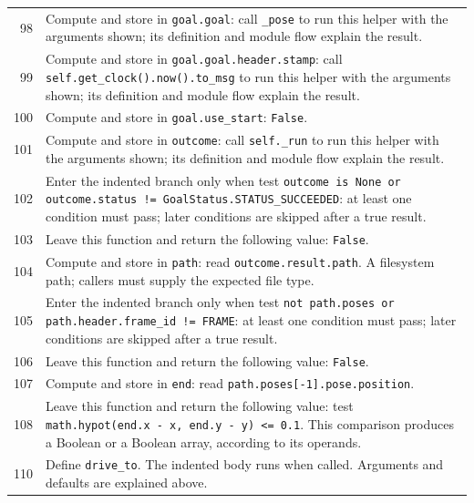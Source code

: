 \documentclass[11pt,a4paper]{book}
\begin{document}
\begin{longtable}{r p{}}
98 & Compute and store in \texttt{goal.goal}: call \texttt{\_pose} to run this helper with the arguments shown; its definition and module flow explain the result.  \\

99 & Compute and store in \texttt{goal.goal.header.stamp}: call \texttt{self.get\_clock().now().to\_msg} to run this helper with the arguments shown; its definition and module flow explain the result.  \\

100 & Compute and store in \texttt{goal.use\_start}: \texttt{False}.  \\

101 & Compute and store in \texttt{outcome}: call \texttt{self.\_run} to run this helper with the arguments shown; its definition and module flow explain the result.  \\

102 & Enter the indented branch only when test \texttt{outcome is None or outcome.status != GoalStatus.STATUS\_SUCCEEDED}: at least one condition must pass; later conditions are skipped after a true result. \\

103 & Leave this function and return the following value: \texttt{False}. \\

104 & Compute and store in \texttt{path}: read \texttt{outcome.result.path}. A filesystem path; callers must supply the expected file type. \\

105 & Enter the indented branch only when test \texttt{not path.poses or path.header.frame\_id != FRAME}: at least one condition must pass; later conditions are skipped after a true result. \\

106 & Leave this function and return the following value: \texttt{False}. \\

107 & Compute and store in \texttt{end}: read \texttt{path.poses[-1].pose.position}.  \\

108 & Leave this function and return the following value: test \texttt{math.hypot(end.x - x, end.y - y) <= 0.1}. This comparison produces a Boolean or a Boolean array, according to its operands. \\

110 & Define \texttt{drive\_to}. The indented body runs when called. Arguments and defaults are explained above. \\


\end{longtable}
\end{document}
